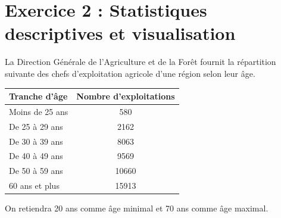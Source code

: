 \documentclass[12pt,a4paper]{article}
\begin{document}
\section*{Exercice 2 : Statistiques descriptives et visualisation}

La Direction Générale de l'Agriculture et de la Forêt fournit la répartition suivante des chefs d'exploitation agricole d'une région selon leur âge.

\begin{center}
\begin{tabular}{|l|c|}
\hline
Tranche d'âge & Nombre d'exploitations\\
\hline
Moins de 25 ans & 580\\
De 25 à 29 ans & 2162\\
De 30 à 39 ans & 8063\\
De 40 à 49 ans & 9569\\
De 50 à 59 ans & 10660\\
60 ans et plus & 15913\\
\hline
\end{tabular}
\end{center}

On retiendra 20 ans comme âge minimal et 70 ans comme âge maximal.
\end{document}
